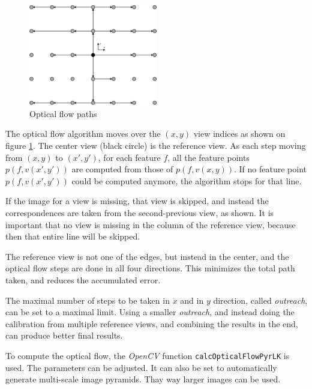 \documentclass[11pt]{scrreprt}
\begin{document}
\begin{figure}
\centering
\includegraphics[width=0.5\textwidth]{opticalflow.pdf}
\caption{Optical flow paths}
\label{fig:opticalflow}
\end{figure}

The optical flow algorithm moves over the $(x,y)$ view indices as shown on figure \ref{fig:opticalflow}. The center view (black circle) is the reference view. As each step moving from $(x,y)$ to $(x',y')$, for each feature $f$, all the feature points $p(f,v(x',y'))$ are computed from those of $p(f,v(x,y))$. If no feature point $p(f,v(x',y'))$ could be computed anymore, the algorithm stops for that line.

If the image for a view is missing, that view is skipped, and instead the correspondences are taken from the second-previous view, as shown. It is important that no view is missing in the column of the reference view, because then that entire line will be skipped.

The reference view is not one of the edges, but instead in the center, and the optical flow steps are done in all four directions. This minimizes the total path taken, and reduces the accumulated error.

The maximal number of steps to be taken in $x$ and in $y$ direction, called \emph{outreach}, can be set to a maximal limit. Using a smaller \emph{outreach}, and instead doing the calibration from multiple reference views, and combining the results in the end, can produce better final results.

To compute the optical flow, the \emph{OpenCV} function \texttt{calcOpticalFlowPyrLK} is used. The parameters can be adjusted. It can also be set to automatically generate multi-scale image pyramids. Thay way larger images can be used.
\end{document}
